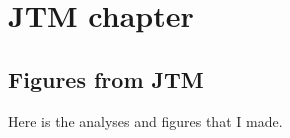\doublespacing

\chapter{ JTM chapter }

\section{Figures from JTM}

Here is the analyses and figures that I made.





\singlespacing
\printbibliography
